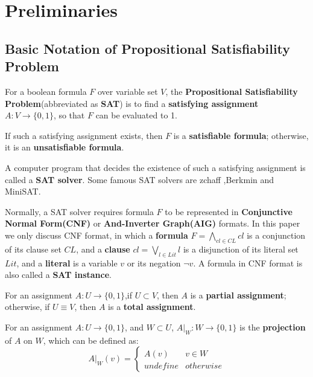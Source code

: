 \documentclass[journal]{IEEEtran}
\begin{document}
\section{Preliminaries}\label{sec_pre}

\subsection{Basic Notation of Propositional Satisfiability Problem}
For a boolean formula $F$ over variable set $V$,
the \textbf{Propositional Satisfiability Problem}(abbreviated as \textbf{SAT}) is to find a \textbf{satisfying assignment} $A:V\to \{0,1\}$,
so that $F$ can be evaluated to 1.

If such a satisfying assignment exists, then $F$ is a \textbf{satisfiable formula};
otherwise,
it is an \textbf{unsatisfiable formula}.

A computer program that decides the existence of such a satisfying assignment is called a \textbf{SAT solver}.
Some famous SAT solvers are zchaff\cite{CHAFF} ,Berkmin\cite{BERKMIN} and MiniSAT\cite{EXTSAT}.

Normally,
a SAT solver requires formula $F$ to be represented in \textbf{Conjunctive Normal Form(CNF)} or \textbf{And-Inverter Graph(AIG)} formats.
In this paper we only discuss CNF format,
in which a \textbf{formula} $F=\bigwedge_{cl\in CL}cl$ is a conjunction of its clause set $CL$,
and a \textbf{clause} $cl=\bigvee_{l\in Lit}l$ is a disjunction of its literal set $Lit$,
and a \textbf{literal} is a variable $v$ or its negation $\neg v$.
A formula in CNF format is also called a \textbf{SAT instance}.

For an assignment $A:U\to \{0,1\}$,if $U\subset V$, then $A$ is a \textbf{partial assignment};
otherwise,
if $U\equiv V$, then $A$ is a \textbf{total assignment}.

For an assignment $A:U\to \{0,1\}$,
and $W\subset U$, $A|_W:W\to \{0,1\}$ is the \textbf{projection} of $A$ on $W$,
which can be defined as:
\begin{displaymath}
A|_W(v)=\left\{ \begin{array}{ll}
A(v) & v\in W \\
undefine & otherwise
\end{array}
\right.
\end{displaymath}
\end{document}
